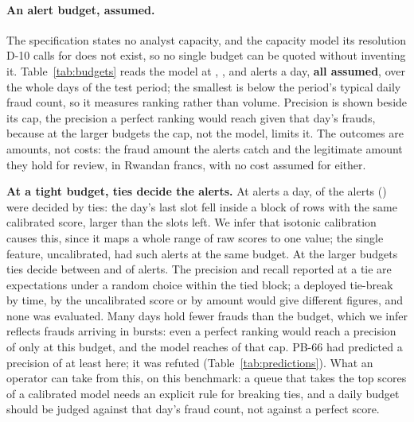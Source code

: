 \paragraph{An alert budget, assumed.} The specification states no analyst capacity, and the capacity
model its resolution D-10 calls for does not exist, so no single budget can be quoted without
inventing it. Table~\ref{tab:budgets} reads the model at \nBudKA{}, \nBudKB{}, \nBudKC{} and
\nBudKD{} alerts a day, \textbf{all assumed}, over the \nPbDays{} whole days of the test period; the
smallest is below the period's typical daily fraud count, so it measures ranking rather than volume.
Precision is shown beside its cap, the precision a perfect ranking would reach given that
day's frauds, because at the larger budgets the cap, not the model, limits it. The outcomes are
amounts, not costs: the fraud amount the alerts catch and the legitimate amount they hold for review,
in Rwandan francs, with no cost assumed for either.

\textbf{At a tight budget, ties decide the alerts.} At \nBudKA{} alerts a day, \nBudATies{} of the
\nBudAAlerts{} alerts (\nBudATiesPct{}) were decided by ties: the day's last slot fell inside a block of
rows with the same calibrated score, larger than the slots left. We infer that isotonic calibration
causes this, since it maps a whole range of raw scores to one value; the single feature, uncalibrated,
had
\nBaseBudATies{} such alerts at the same budget. At the larger budgets ties decide between
\nBudTiesPctLow{} and \nBudTiesPctHigh{} of alerts. The precision and recall reported at a tie are
expectations under a random choice within the tied block; a deployed tie-break by time, by the
uncalibrated score or by amount would give different figures, and none was evaluated. Many days hold
fewer frauds than the budget, which we infer reflects frauds arriving in bursts: even a perfect ranking would reach a
precision of only \nBudACeil{} at this budget, and the model reaches \nBudAShare{} of that cap.
PB-66 had predicted a precision of at least \nBudPredPrec{} here; it was refuted
(Table~\ref{tab:predictions}). What an operator can take from this, on this benchmark: a queue that
takes the top scores of a calibrated model needs an explicit rule for breaking ties, and a daily budget
should be judged against that day's fraud count, not against a perfect score.

